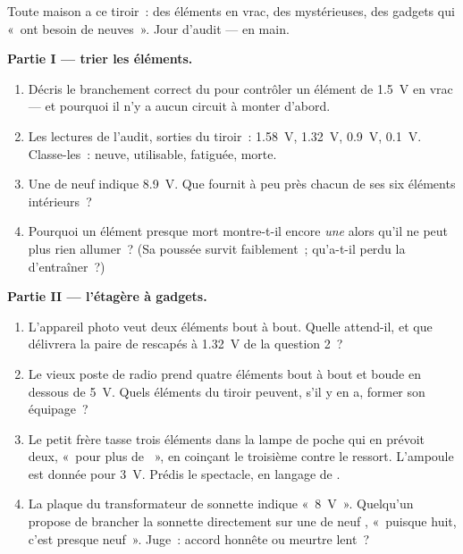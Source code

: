 \begin{problem}\label{pb:g8:voltage-voltmeter:1}
Toute maison a ce tiroir~: des éléments en vrac, des 
mystérieuses, des gadgets qui «~ont besoin de neuves~». Jour d'audit
---  en main.

\medskip\noindent\textbf{Partie I --- trier les éléments.}
\begin{enumerate}
  \item Décris le branchement correct du  pour contrôler un
        élément de \qty{1.5}{V} en vrac --- et pourquoi il n'y a
        aucun circuit à monter d'abord.
  \item Les lectures de l'audit, sorties du tiroir~: \qty{1.58}{V},
        \qty{1.32}{V}, \qty{0.9}{V}, \qty{0.1}{V}. Classe-les~:
        neuve, utilisable, fatiguée, morte.
  \item Une  de neuf  indique \qty{8.9}{V}. Que fournit à
        peu près chacun de ses six éléments intérieurs~?
  \item Pourquoi un élément presque mort montre-t-il encore
        \emph{une}  alors qu'il ne peut plus rien allumer~?
        (Sa poussée survit faiblement~; qu'a-t-il perdu la 
        d'entraîner~?)
\end{enumerate}

\medskip\noindent\textbf{Partie II --- l'étagère à gadgets.}
\begin{enumerate}[resume]
  \item L'appareil photo veut deux éléments bout à bout. Quelle
         attend-il, et que délivrera la paire de rescapés à
        \qty{1.32}{V} de la question 2~?
  \item Le vieux poste de radio prend quatre éléments bout à bout et
        boude en dessous de \qty{5}{V}. Quels éléments du tiroir
        peuvent, s'il y en a, former son équipage~?
  \item Le petit frère tasse trois éléments dans la lampe de poche
        qui en prévoit deux, «~pour plus de ~», en coinçant
        le troisième contre le ressort. L'ampoule est donnée pour
        \qty{3}{V}. Prédis le spectacle, en langage de .
  \item La plaque du transformateur de sonnette indique
        «~\qty{8}{V}~». Quelqu'un propose de brancher la sonnette
        directement sur une  de neuf , «~puisque huit,
        c'est presque neuf~». Juge~: accord honnête ou meurtre
        lent~?
\end{enumerate}


\end{problem}
